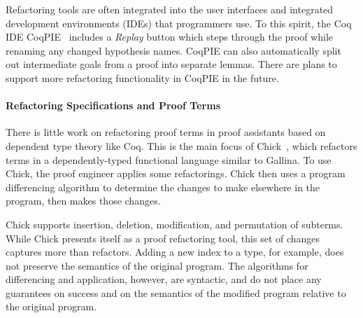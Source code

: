 
Refactoring tools are often integrated into the user interfaces and integrated development environments (IDEs) %
that programmers use. To this spirit, the Coq IDE CoqPIE~\cite{Roe2016} %
includes a \textit{Replay} button which steps through the proof while renaming
any changed hypothesis names. 
CoqPIE can also automatically split out intermediate goals from a proof into separate lemmas. %
There are plans to support more refactoring functionality in CoqPIE in the future. %


\paragraph{Refactoring Specifications and Proof Terms} %

There is little work on refactoring proof terms in proof assistants based on dependent type theory like Coq.
This is the main focus of Chick~\cite{robert2018front}, which refactors terms in a dependently-typed functional language
similar to Gallina. To use Chick, the proof engineer applies some refactorings.
Chick then uses a program differencing algorithm to determine the changes to make elsewhere in the program,
then makes those changes.

Chick supports insertion, deletion, modification, and permutation of subterms.
While Chick presents itself as a proof refactoring tool,
this set of changes captures more than refactors.
Adding a new index to a type, for example, does not preserve the semantics of the original program.
The algorithms for differencing and application, however, are syntactic, and do not place any guarantees on
success and on the semantics of the modified program relative to the original program.


